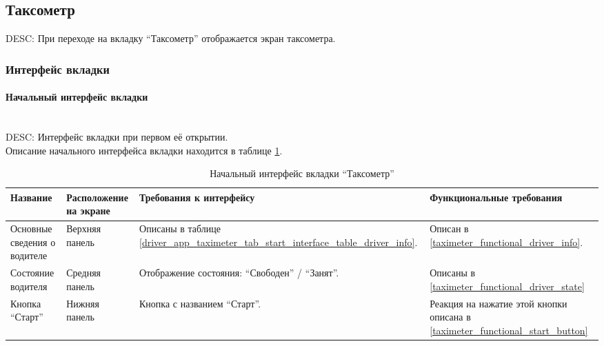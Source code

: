   \subsection{Таксометр} \label{driver_app_taximeter_tab}

    DESC: При переходе на вкладку “Таксометр” отображается экран таксометра.

    \subsubsection{Интерфейс вкладки}

      \paragraph{Начальный интерфейс вкладки} \mbox{}\\ \label{driver_app_taximeter_tab_start_interface}
        DESC: Интерфейс вкладки при первом её открытии. \\
        Описание начального интерфейса вкладки находится в таблице \ref{driver_app_taximeter_tab_start_interface_table}.\\

        \begin{table}[h]
          \begin{center}
          \caption {Начальный интерфейс вкладки “Таксометр”}
          \label{driver_app_taximeter_tab_start_interface_table}
          \setlength{\extrarowheight}{2mm}
            \begin{tabular}{|p{4cm}|p{3cm}|p{4cm}|p{4cm}|}
              \hline     \textbf{Название}&\textbf{Расположение на экране}&\textbf{Требования к интерфейсу}&\textbf{Функциональные требования} \\ [2mm]

              \hline   Основные сведения о водителе & Верхняя панель & Описаны в таблице \ref{driver_app_taximeter_tab_start_interface_table_driver_info}. & Описан в \ref{taximeter_functional_driver_info}.\\ [2mm]

              \hline   Состояние водителя & Средняя панель & Отображение состояния: “Свободен” / “Занят”. & Описаны в \ref{taximeter_functional_driver_state} \\ [2mm]

              \hline   Кнопка “Старт” & Нижняя панель & Кнопка с названием “Старт”. & Реакция на нажатие этой кнопки описана в \ref{taximeter_functional_start_button}\\ [2mm]

              \hline
            \end{tabular}
          \end{center}
        \end{table}

